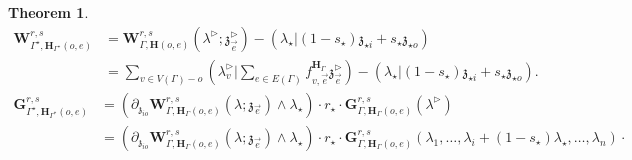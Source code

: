 \documentclass[11pt]{amsart}
\newtheorem{thm}{Theorem}[section]
\newtheorem{cor}[thm]{Corollary}
\theoremstyle{definition}
\theoremstyle{remark}
\numberwithin{equation}{section}
\begin{document}
\begin{thm}
\begin{align*}
      \mathbf{W}^{r,s}_{\Gamma^{\star},\mathbf{H}_{\Gamma^{\star}}(o,e)} &= \mathbf{W}^{r,s}_{\Gamma,\mathbf{H}(o,e)}(\lambda^\triangleright;\mathfrak{z}^\triangleright_{\vec{e}}) -\left(\lambda_{\star}|(1-s_{\star})\mathfrak{z}_{\star i}+s_{\star}\mathfrak{z}_{\star o}\right)\\
   & =\sum_{v\in V(\Gamma)-o}(\lambda^\triangleright_v|\sum_{e\in E(\Gamma)}f^{\mathbf{H}_{\Gamma}}_{v,\vec{e}}\mathfrak{z}^\triangleright_{\vec{e}})-\left(\lambda_{\star}|(1-s_{\star})\mathfrak{z}_{\star i}+s_{\star}\mathfrak{z}_{\star o}\right).
\end{align*}
\begin{align*}
  \mathbf{G}^{r,s}_{\Gamma^{\star},\mathbf{H}_{\Gamma^{\star}}(o,e)} &= \left(\partial_{\mathfrak{z}_{io}}\mathbf{W}^{r,s}_{\Gamma,\mathbf{H}_{\Gamma}(o,e)}(\lambda;\mathfrak{z}_{\vec{e}})\wedge\lambda_{\star}\right)\cdot  r_{\star}\cdot\mathbf{G}^{r,s}_{\Gamma,\mathbf{H}_{\Gamma}(o,e)}(\lambda^\triangleright) \\
   & =\left(\partial_{\mathfrak{z}_{io}}\mathbf{W}^{r,s}_{\Gamma,\mathbf{H}_{\Gamma}(o,e)}(\lambda;\mathfrak{z}_{\vec{e}})\wedge\lambda_{\star}\right)\cdot r_{\star}\cdot\mathbf{G}^{r,s}_{\Gamma,\mathbf{H}_{\Gamma}(o,e)}(\lambda_1,\dots,\lambda_i+(1-s_{\star})\lambda_{\star},\dots,\lambda_{n})\cdot
\end{align*}

\end{thm}

\iffalse
We have following corollaries.
\begin{cor}
  The value $\mu_{V(\Gamma)}\left(W_{\Gamma}(\mathfrak{z}_{\vec{e}})\right)$ for a type 1 Lamman graph is determined by the chiral 2-operation.
\end{cor}
\fi
\end{document}

